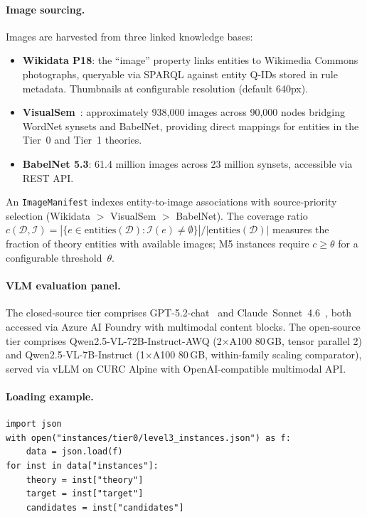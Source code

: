 \documentclass{article}
\theoremstyle{definition}
\newcommand{\D}{\mathcal{D}}
\begin{document}
\paragraph{Image sourcing.} Images are harvested from three linked knowledge bases:
\begin{itemize}[nosep]
\item \textbf{Wikidata P18}: the ``image'' property links entities to Wikimedia Commons photographs, queryable via SPARQL against entity Q-IDs stored in rule metadata. Thumbnails at configurable resolution (default 640px).
\item \textbf{VisualSem}~\cite{geigle2024babelimagenet}: approximately 938,000 images across 90,000 nodes bridging WordNet synsets and BabelNet, providing direct mappings for entities in the Tier~0 and Tier~1 theories.
\item \textbf{BabelNet 5.3}: 61.4 million images across 23 million synsets, accessible via REST API.
\end{itemize}
An \texttt{ImageManifest} indexes entity-to-image associations with source-priority selection (Wikidata $>$ VisualSem $>$ BabelNet). The coverage ratio $c(\D, \mathcal{I}) = |\{e \in \mathrm{entities}(\D) : \mathcal{I}(e) \neq \emptyset\}| / |\mathrm{entities}(\D)|$ measures the fraction of theory entities with available images; M5 instances require $c \geq \theta$ for a configurable threshold~$\theta$.

\paragraph{VLM evaluation panel.} The closed-source tier comprises GPT-5.2-chat~\cite{openai2025gpt52} and Claude~Sonnet~4.6~\cite{anthropic2024claude}, both accessed via Azure AI Foundry with multimodal content blocks. The open-source tier comprises Qwen2.5-VL-72B-Instruct-AWQ (2$\times$A100 80\,GB, tensor parallel 2) and Qwen2.5-VL-7B-Instruct (1$\times$A100 80\,GB, within-family scaling comparator), served via vLLM on CURC Alpine with OpenAI-compatible multimodal API.

\paragraph{Loading example.}
\begin{verbatim}
import json
with open("instances/tier0/level3_instances.json") as f:
    data = json.load(f)
for inst in data["instances"]:
    theory = inst["theory"]
    target = inst["target"]
    candidates = inst["candidates"]
\end{verbatim}
\end{document}
